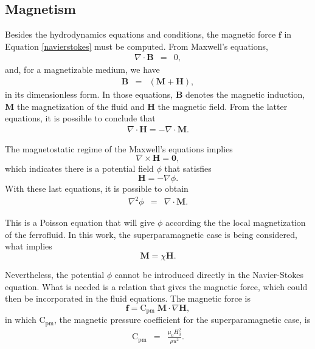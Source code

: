 \documentclass[journal]{IEEEtran}
\begin{document}
\subsection{Magnetism}
Besides the hydrodynamics equations and conditions, the magnetic force $\mathbf{f}$ in Equation \ref{navierstokes} must be computed. From Maxwell's equations, \begin{eqnarray}
\nabla\cdot \mathbf{B} & = & 0\label{secondmagneticequation},
\end{eqnarray} and, for a magnetizable medium, we have \begin{eqnarray}
\mathbf{B} &=& (\mathbf{M}+\mathbf{H}),\label{firstmagneticequation}
\end{eqnarray}
in its dimensionless form. In those equations, $\mathbf{B}$ denotes the magnetic induction, $\mathbf{M}$ the magnetization of the fluid and $\mathbf{H}$ the magnetic field. From the latter equations, it is possible to conclude that \begin{eqnarray}
\nabla\cdot\mathbf{H} = -\nabla\cdot \mathbf{M}\label{mh1}.
\end{eqnarray}

The magnetostatic regime of the Maxwell's equations implies \begin{equation}\nabla\times \mathbf{H} = \mathbf{0},
\end{equation} which indicates there is a potential field $\phi$ that satisfies \begin{equation}\mathbf{H} = -\nabla \phi.\label{Hphipotencial}\end{equation} With these last equations, it is possible to obtain \begin{eqnarray}
\nabla^2\phi &=& \nabla\cdot \mathbf{M}.\label{eqcampomag}
\end{eqnarray}

This is a Poisson equation that will give $\phi$ according the the local magnetization of the ferrofluid. In this work, the superparamagnetic case is being considered, what implies \begin{equation}\mathbf{M} = \chi \mathbf{H}.\end{equation}

Nevertheless, the potential $\phi$ cannot be introduced directly in the Navier-Stokes equation. What is needed is a relation that gives the magnetic force, which could then be incorporated in the fluid equations. The magnetic force is \begin{equation}
	\mathbf{f} = \mathrm{C}_{\mathrm{pm}}\; \mathbf{M}\cdot \nabla \mathbf{H},\label{magneticforce}\end{equation} in which $\mathrm{C}_{\mathrm{pm}}$, the magnetic pressure coefficient for the superparamagnetic case, is \begin{eqnarray}
\mathrm{C}_{\mathrm{pm}} & = & \frac{\mu_0 H_0^2}{\rho u^2}.\label{cpm}
\end{eqnarray}
\end{document}
